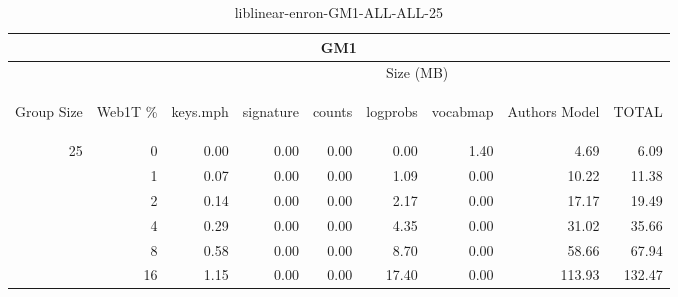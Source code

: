 \begin{center}
\begin{table}[htbp]
\begin{tabular}{ | r | r | r | r | r | r | r | r | r |}
\hline
\multicolumn{9}{|c|}{GM1}\\
\hline
 & & \multicolumn{7}{|c|}{Size (MB)}\\ \cline{3-9}
\begin{sideways}Group Size\end{sideways} & \begin{sideways}Web1T \% \end{sideways} & \begin{sideways}keys.mph\end{sideways} & \begin{sideways}signature\end{sideways} & \begin{sideways}counts\end{sideways} & \begin{sideways}logprobs\end{sideways} & \begin{sideways}vocabmap\end{sideways} & \begin{sideways}Authors Model \end{sideways} & \begin{sideways}TOTAL\end{sideways}\\
\hline
\multirow{5}{*}{25}
 & 0 & 0.00 & 0.00 & 0.00 & 0.00 & 1.40 & 4.69 & 6.09\\ \cline{2-9}
 & 1 & 0.07 & 0.00 & 0.00 & 1.09 & 0.00 & 10.22 & 11.38\\ \cline{2-9}
 & 2 & 0.14 & 0.00 & 0.00 & 2.17 & 0.00 & 17.17 & 19.49\\ \cline{2-9}
 & 4 & 0.29 & 0.00 & 0.00 & 4.35 & 0.00 & 31.02 & 35.66\\ \cline{2-9}
 & 8 & 0.58 & 0.00 & 0.00 & 8.70 & 0.00 & 58.66 & 67.94\\ \cline{2-9}
 & 16 & 1.15 & 0.00 & 0.00 & 17.40 & 0.00 & 113.93 & 132.47\\ \cline{2-9}
\hline
\end{tabular}
\caption{liblinear-enron-GM1-ALL-ALL-25}
\label{table:liblinear-enron-GM1-ALL-ALL-25}
\end{table}
\end{center}

